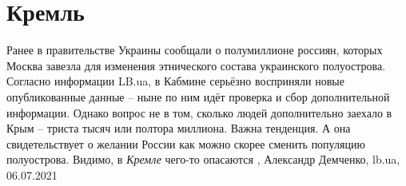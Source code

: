  
 
 
 
 
\chapter{Кремль}

Ранее в правительстве Украины сообщали о полумиллионе россиян, которых Москва
завезла для изменения этнического состава украинского полуострова. Согласно
информации LB.ua, в Кабмине серьёзно восприняли новые опубликованные данные –
ныне по ним идёт проверка и сбор дополнительной информации.
Однако вопрос не в том, сколько людей дополнительно заехало в Крым – триста
тысяч или полтора миллиона. Важна тенденция. А она свидетельствует о желании
России как можно скорее сменить популяцию полуострова. Видимо, в \emph{Кремле} чего-то
опасаются
, 
Александр Демченко, lb.ua, 06.07.2021
